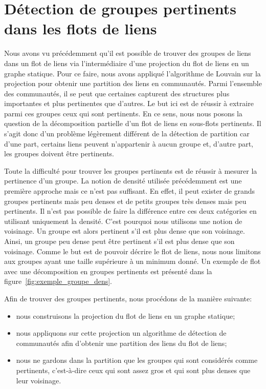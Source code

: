 \chapter{Détection de groupes pertinents dans les flots de liens}
\minitoc

\label{groupesDense}
Nous avons vu précédemment qu'il est possible de trouver des groupes de liens dans un flot de liens via l'intermédiaire d'une projection du flot de liens en un graphe statique.
Pour ce faire, nous avons appliqué l'algorithme de Louvain sur la projection pour obtenir une partition des liens en communautés.
Parmi l'ensemble des communautés, il se peut que certaines capturent des structures plus importantes et plus pertinentes que d'autres.
Le but ici est de réussir à extraire parmi ces groupes ceux qui sont pertinents.
En ce sens, nous nous posons la question de la décomposition partielle d'un flot de liens en sous-flots pertinents.
Il s'agit donc d'un problème légèrement différent de la détection de partition car d'une part, certains liens peuvent n'appartenir à aucun groupe et, d'autre part, les groupes doivent être pertinents.

Toute la difficulté pour trouver les groupes pertinents est de réussir à mesurer la pertinence d'un groupe.
La notion de densité utilisée précédemment est une première approche mais ce n'est pas suffisant.
En effet, il peut exister de grands groupes pertinents mais peu denses et de petits groupes très denses mais peu pertinents.
Il n'est pas possible de faire la différence entre ces deux catégories en utilisant uniquement la densité.
C'est pourquoi nous utilisons une notion de voisinage.
Un groupe est alors pertinent s'il est plus dense que son voisinage.
Ainsi, un groupe peu dense peut être pertinent s'il est plus dense que son voisinage.
Comme le but est de pouvoir décrire le flot de liens, nous nous limitons aux groupes ayant une taille supérieure à un minimum donné.
Un exemple de flot avec une décomposition en groupes pertinents est présenté dans la figure~\ref{fig:exemple_groupe_dens}.

Afin de trouver des groupes pertinents, nous procédons de la manière suivante:
\begin{itemize}
\item nous construisons la projection du flot de liens en un graphe statique;
\item nous appliquons sur cette projection un algorithme de détection de communautés afin d'obtenir une partition des liens du flot de liens;
\item nous ne gardons dans la partition que les groupes qui sont considérés comme pertinents, c'est-à-dire ceux qui sont assez gros et qui sont plus denses que leur voisinage.
\end{itemize}


